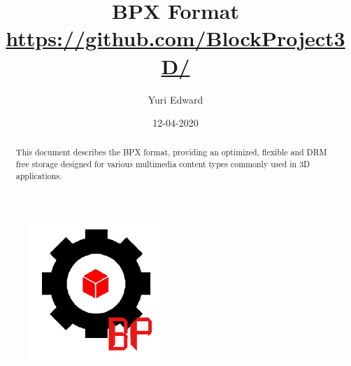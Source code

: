 \documentclass{article}
\title{
    \huge \textbf{BPX Format} \\
    \large \url{https://github.com/BlockProject3D/}
}
\author{Yuri Edward}
\date{12-04-2020}
\begin{document}
\maketitle

\begin{figure}[h!]
    \centering
    \includegraphics[scale=1.1]{logo}
    \label{fig:logo}
\end{figure}

\newpage

\begin{abstract}
    This document describes the BPX format, providing an optimized, flexible and DRM \cite{DRM} free storage designed for various multimedia content types commonly used in 3D applications.
\end{abstract}
\doclicenseThis















\end{document}
